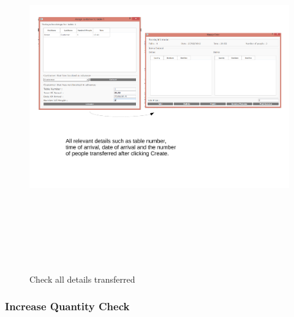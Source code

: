 \begin{landscape}
\begin{figure}[H]
    \includegraphics[height = 15cm]{./Testing/images/test5.pdf}
    \caption{Check all details transferred} \label{fig:Test5}
\end{figure}

\subsubsection{Increase Quantity Check}


\end{landscape}

